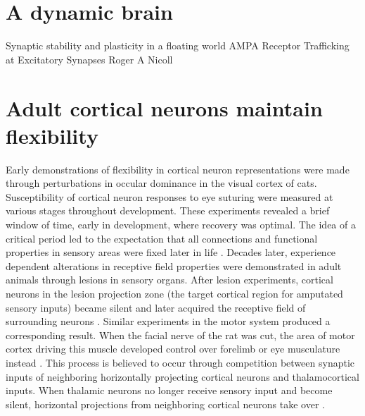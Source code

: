 \section{A dynamic brain}
Synaptic stability and plasticity in a floating world
AMPA Receptor Trafficking at Excitatory Synapses Roger A Nicoll
 
\section{Adult cortical neurons maintain flexibility}
Early demonstrations of flexibility in cortical neuron representations were made through perturbations in occular dominance in the visual cortex of cats. Susceptibility of cortical neuron responses to eye suturing were measured at various stages throughout development. These experiments revealed a brief window of time, early in development, where recovery was optimal. The idea of a critical period led to the expectation that all connections and functional properties in sensory areas were fixed later in life \citep{Gilbert1990}.  Decades later, experience dependent alterations in receptive field properties were demonstrated in adult animals through lesions in sensory organs. After lesion experiments, cortical neurons in the lesion projection zone (the target cortical region for amputated sensory inputs) became silent and later acquired the receptive field of surrounding neurons \citep{Merzenich1984, Robertson1989, Kaas1990}. Similar experiments in the motor system produced a corresponding result. When the facial nerve of the rat was cut, the area of motor cortex driving this muscle developed control over forelimb or eye musculature instead \citep{Gilbert1992}. This process is believed to occur through competition between synaptic inputs of neighboring horizontally projecting cortical neurons and thalamocortical inputs. When thalamic neurons no longer receive sensory input and become silent, horizontal projections from neighboring cortical neurons take over \citep{Darian-Smith1994}. 

\bigskip

